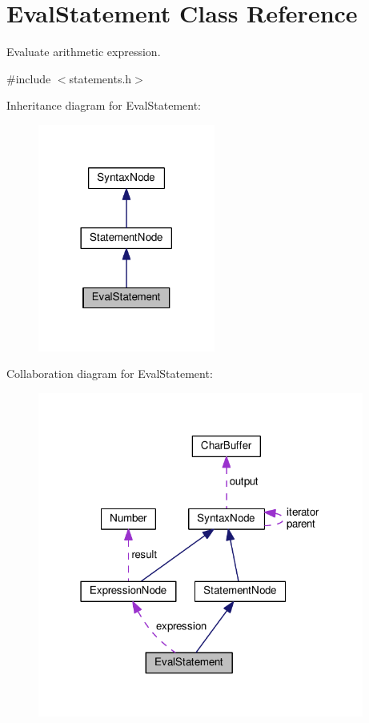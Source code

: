 \hypertarget{classEvalStatement}{}\section{Eval\+Statement Class Reference}
\label{classEvalStatement}


Evaluate arithmetic expression.  




{\ttfamily \#include $<$statements.\+h$>$}



Inheritance diagram for Eval\+Statement\+:
\nopagebreak
\begin{figure}[H]
\begin{center}
\leavevmode
\includegraphics[width=165pt]{da/ddc/classEvalStatement__inherit__graph}
\end{center}
\end{figure}


Collaboration diagram for Eval\+Statement\+:
\nopagebreak
\begin{figure}[H]
\begin{center}
\leavevmode
\includegraphics[width=304pt]{d6/dee/classEvalStatement__coll__graph}
\end{center}
\end{figure}
